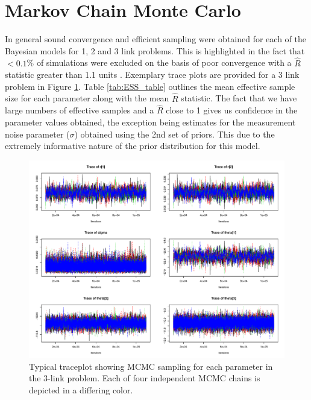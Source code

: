 \documentclass{article}
\begin{document}
\section{Markov Chain Monte Carlo}
In general sound convergence and efficient sampling were obtained for each of the Bayesian models for 1, 2 and 3 link problems.  This is highlighted in the fact that $< 0.1$\% of simulations were excluded on the basis of poor convergence with a $\hat{R}$ statistic greater than 1.1 units \citep{brooks_general_1998}.  Exemplary trace plots are provided for a 3 link problem in Figure \ref{fig:traceplot}. Table \ref{tab:ESS_table} outlines the mean effective sample size for each parameter along with the mean $\hat{R}$ statistic.  The fact that we have large numbers of effective samples and a $\hat{R}$ close to 1 gives us confidence in the parameter values obtained, the exception being estimates for the measurement noise parameter ($\sigma$) obtained using the 2nd set of priors.  This due to the extremely informative nature of the prior distribution for this model.

\begin{figure}
\centering
\includegraphics[width=\textwidth]{./Figures/traceplot.pdf}
\caption{Typical traceplot showing MCMC sampling for each parameter in the 3-link problem.  Each of four independent MCMC chains is depicted in a differing color.}
\label{fig:traceplot}
\end{figure}
\end{document}
